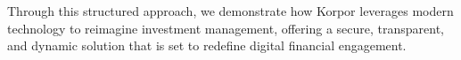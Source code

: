 \vspace{0.05cm}
\noindent Through this structured approach, we demonstrate how Korpor leverages modern technology to reimagine investment management, offering a secure, transparent, and dynamic solution that is set to redefine digital financial engagement.

\endgroup %
\enlargethispage{4cm} %